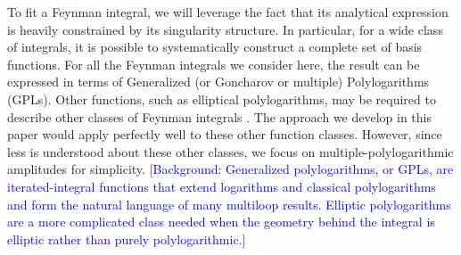 \documentclass[a4paper,11pt]{article}
\begin{document}
To fit a Feynman integral, we will leverage the fact that its analytical expression is heavily constrained by its singularity structure. In particular, for a wide class of integrals, it is possible to systematically construct a complete set of basis functions. For all the Feynman integrals we consider here, the result can be expressed in terms of Generalized (or Goncharov or multiple) Polylogarithms~\cite{Goncharov:1998kja, Goncharov:2010jf, Duhr:2012fh} (GPLs). Other functions, such as elliptical polylogarithms, may be required to describe other classes of Feynman integrals \cite{Georgoudis:2015hca, Bourjaily:2018ycu, Duhr:2022dxb, Bourjaily:2022bwx}. The approach we develop in this paper would apply perfectly well to these other function classes. However, since less is understood about these other classes, we focus on multiple-polylogarithmic amplitudes for simplicity.
\textcolor{blue}{\small [Background: Generalized polylogarithms, or GPLs, are iterated-integral functions that extend logarithms and classical polylogarithms and form the natural language of many multiloop results. Elliptic polylogarithms are a more complicated class needed when the geometry behind the integral is elliptic rather than purely polylogarithmic.]}
\end{document}
